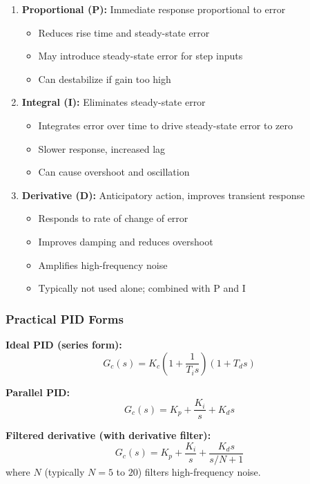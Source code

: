 \begin{enumerate}
    \item \textbf{Proportional (P):} Immediate response proportional to error
    \begin{itemize}
        \item Reduces rise time and steady-state error
        \item May introduce steady-state error for step inputs
        \item Can destabilize if gain too high
    \end{itemize}

    \item \textbf{Integral (I):} Eliminates steady-state error
    \begin{itemize}
        \item Integrates error over time to drive steady-state error to zero
        \item Slower response, increased lag
        \item Can cause overshoot and oscillation
    \end{itemize}

    \item \textbf{Derivative (D):} Anticipatory action, improves transient response
    \begin{itemize}
        \item Responds to rate of change of error
        \item Improves damping and reduces overshoot
        \item Amplifies high-frequency noise
        \item Typically not used alone; combined with P and I
    \end{itemize}
\end{enumerate}

\subsubsection{Practical PID Forms}

\textbf{Ideal PID (series form):}
\begin{equation}
    G_c(s) = K_c \left(1 + \frac{1}{T_i s}\right)(1 + T_d s)
\end{equation}

\textbf{Parallel PID:}
\begin{equation}
    G_c(s) = K_p + \frac{K_i}{s} + K_d s
\end{equation}

\textbf{Filtered derivative (with derivative filter):}
\begin{equation}
    G_c(s) = K_p + \frac{K_i}{s} + \frac{K_d s}{s/N + 1}
\end{equation}
where $N$ (typically $N = 5$ to $20$) filters high-frequency noise.

